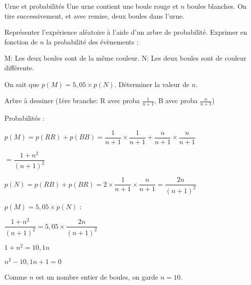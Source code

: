 \def\rdifficulty{2.5}
\begin{EXO}{Urne et probabilités}{}
Une urne contient une boule rouge et $n$ boules blanches. On tire successivement, et avec remise, deux boules dans l'urne.
\begin{tcbenumerate}[1]
\tcbitem Représenter l'expérience aléatoire à l'aide d'un arbre de probabilité.
\tcbitem[boxrule=0.4pt,colframe=black] Exprimer en fonction de $n$ la probabilité des évènements :
\begin{tcbenumerate}[2][1][alph]
\tcbitem {} M: \og Les deux boules sont de la même couleur. \fg{}
\tcbitem {} N: \og Les deux boules sont de couleur différente. \fg{}
\end{tcbenumerate}
\tcbitem {} On sait que $p(M)=5,05\times p(N)$. Déterminer la valeur de $n$.
\end{tcbenumerate}

\exocorrection

\begin{tcbenumerate}[1]
\tcbitem Arbre à dessiner (1ère branche: R avec proba $\frac{1}{n+1}$, B avec proba $\frac{n}{n+1}$)

\tcbitem Probabilités :
\begin{tcbenumerate}[1][1][alph]
\tcbitem $p(M) = p(RR) + p(BB) = \dfrac{1}{n+1} \times \dfrac{1}{n+1} + \dfrac{n}{n+1} \times \dfrac{n}{n+1}$

$= \dfrac{1 + n^2}{(n+1)^2}$

\tcbitem $p(N) = p(RB) + p(BR) = 2 \times \dfrac{1}{n+1} \times \dfrac{n}{n+1} = \dfrac{2n}{(n+1)^2}$
\end{tcbenumerate}

\tcbitem $p(M) = 5,05 \times p(N)$ :

$\dfrac{1 + n^2}{(n+1)^2} = 5,05 \times \dfrac{2n}{(n+1)^2}$

$1 + n^2 = 10,1n$

$n^2 - 10,1n + 1 = 0$


Comme $n$ est un nombre entier de boules, on garde $n = 10$.
\end{tcbenumerate}
\end{EXO}
